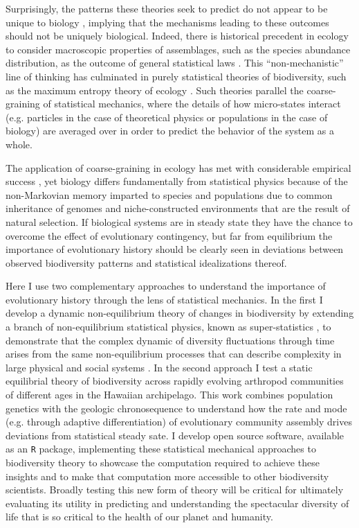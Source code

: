 Surprisingly, the patterns these theories seek to predict do not
appear to be unique to biology \citep{nekola2007}, implying that the
mechanisms leading to these outcomes should not be uniquely
biological.  Indeed, there is historical precedent in ecology to
consider macroscopic properties of assemblages, such as the species
abundance distribution, as the outcome of general statistical laws
\citep{fisher1943, preston1950, preston1962a, preston1962b}. This
``non-mechanistic'' line of thinking has culminated in purely
statistical theories of biodiversity, such as the maximum entropy
theory of ecology \citep{harte2011}. Such theories parallel the
coarse-graining of statistical mechanics, where the details of how
micro-states interact (e.g. particles in the case of theoretical
physics or populations in the case of biology) are averaged over in
order to predict the behavior of the system as a whole.

The application of coarse-graining in ecology has met with
considerable empirical success \citep[e.g.][]{banavar2007, pueyo2007,
  dewar2008, harte2011}, yet biology differs fundamentally from
statistical physics because of the non-Markovian memory imparted to
species and populations due to common inheritance of genomes and
niche-constructed environments \citep{odling2003} that are the result
of natural selection.  If biological systems are in steady state they
have the chance to overcome the effect of evolutionary contingency,
but far from equilibrium the importance of evolutionary history should
be clearly seen in deviations between observed biodiversity patterns
and statistical idealizations thereof.

Here I use two complementary approaches to understand the importance
of evolutionary history through the lens of statistical mechanics.
In the first I develop a dynamic non-equilibrium theory of changes in
biodiversity by extending a branch of non-equilibrium statistical
physics, known as super-statistics \citep{beck2003, beck2004}, to
demonstrate that the complex dynamic of diversity fluctuations
through time arises from the same non-equilibrium processes that can
describe complexity in large physical \citep{beck2004} and social
systems \citep{fuentes2009}.  In the second approach I test a static
equilibrial theory of biodiversity \citep[the maximum entropy theory
of ecology][]{harte2011} across rapidly evolving arthropod
communities of different ages in the Hawaiian archipelago. This work
combines population genetics with the geologic chronosequence to
understand how the rate and mode (e.g. through adaptive
differentiation) of evolutionary community assembly drives deviations
from statistical steady sate. I develop open source software,
available as an \texttt{R} package, implementing these statistical
mechanical approaches to biodiversity theory to showcase the
computation required to achieve these insights and to make that
computation more accessible to other biodiversity scientists.  Broadly
testing this new form of theory will be critical for ultimately
evaluating its utility in predicting and understanding the spectacular
diversity of life that is so critical to the health of our planet and
humanity.


\printbibliography[heading=subbibliography]

